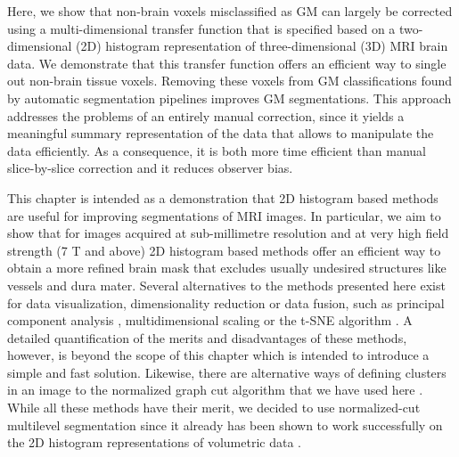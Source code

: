 Here, we show that non-brain voxels misclassified as GM can largely be corrected using a multi-dimensional transfer function that is specified based on a two-dimensional (2D) histogram representation \parencite{Kindlmann1998, Kniss2001, Kniss2005, Ip2012} of three-dimensional (3D) MRI brain data. We demonstrate that this transfer function offers an efficient way to single out non-brain tissue voxels. Removing these voxels from GM classifications found by automatic segmentation pipelines improves GM segmentations. This approach addresses the problems of an entirely manual correction, since it yields a meaningful summary representation of the data that allows to manipulate the data efficiently. As a consequence, it is both more time efficient than manual slice-by-slice correction and it reduces observer bias.

This chapter is intended as a demonstration that 2D histogram based methods are useful for improving segmentations of MRI images. In particular, we aim to show that for images acquired at sub-millimetre resolution and at very high field strength (7 T and above) 2D histogram based methods offer an efficient way to obtain a more refined brain mask that excludes usually undesired structures like vessels and dura mater. Several alternatives to the methods presented here exist for data visualization, dimensionality reduction or data fusion, such as principal component analysis \parencite{PCA2002}, multidimensional scaling \parencite{MDS2005} or the t-SNE algorithm \parencite{VanDerMaaten2008}. A detailed quantification of the merits and disadvantages of these methods, however, is beyond the scope of this chapter which is intended to introduce a simple and fast solution. Likewise, there are alternative ways of defining clusters in an image to the normalized graph cut algorithm that we have used here \parencite{Venkataraju2009, Jain2011, Liu2012, NunezIglesias2013}. While all these methods have their merit, we decided to use normalized-cut multilevel segmentation since it already has been shown to work successfully on the 2D histogram representations of volumetric data \parencite{Ip2012}.


